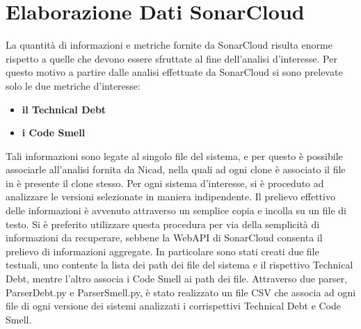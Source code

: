 \section{Elaborazione Dati SonarCloud}
La quantità di informazioni e metriche fornite da SonarCloud risulta enorme rispetto a quelle che devono essere sfruttate al fine dell'analisi d'interesse. Per questo motivo a partire dalle analisi effettuate da SonarCloud si sono prelevate solo le due metriche d'interesse:
\begin{itemize}
	\item \textbf{il Technical Debt} 
	\item \textbf{i Code Smell}
\end{itemize}
Tali informazioni sono legate al singolo file del sistema, e per questo è possibile associarle all'analisi fornita da Nicad, nella quali ad ogni clone è associato il file in è presente il clone stesso. Per ogni sistema d'interesse, si è proceduto ad analizzare le versioni selezionate in maniera indipendente. Il prelievo effettivo delle informazioni è avvenuto attraverso un semplice copia e incolla su un file di testo. Si è preferito utilizzare questa procedura per via della semplicità di informazioni da recuperare, sebbene la WebAPI di SonarCloud consenta il prelievo di informazioni aggregate.
In particolare sono stati creati due file testuali, uno contente la lista dei path dei file del sistema e il rispettivo Technical Debt, mentre l'altro associa i Code Smell ai path dei file. Attraverso due parser, ParserDebt.py e ParserSmell.py, è stato realizzato un file CSV che associa ad ogni file di ogni versione dei sistemi analizzati i corrispettivi Technical Debt e Code Smell.